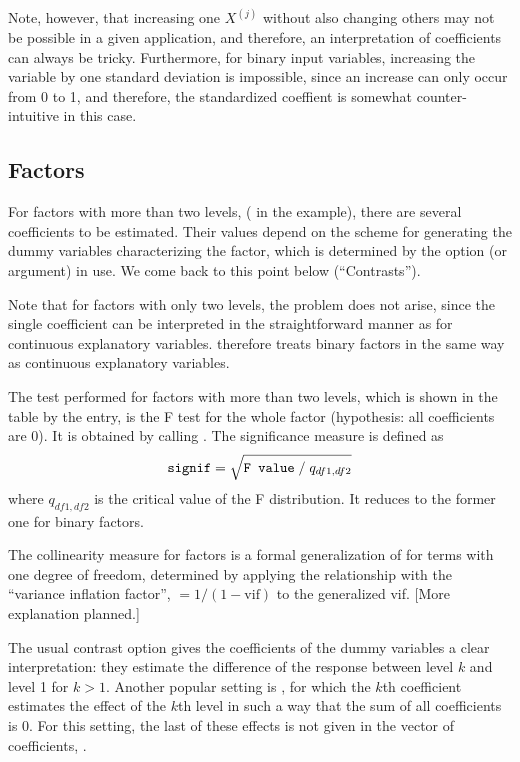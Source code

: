 \documentclass[11pt]{article}
\begin{document}
Note, however, that increasing one $X^{(j)}$ without also changing
others may not be possible in a given application, and therefore, 
an interpretation of coefficients can always be tricky.
Furthermore, for binary input variables, increasing the variable by one
standard deviation is impossible, since an increase can only occur from 0
to 1, and therefore, the standardized coeffient is somewhat 
counter-intuitive in this case.

\subsection{Factors}
For factors with more than two levels, ( in the example), there
are several coefficients to be estimated. 
Their values depend on the scheme for generating the 
dummy variables characterizing the factor, which is determined 
by the  option (or argument) in use.
We come back to this point below (``Contrasts'').

Note that for factors with only two levels, the problem does not arise,
since the single 
coefficient can be interpreted in the straightforward manner as 
for continuous explanatory variables.  therefore treats binary
factors in the same way as continuous explanatory variables.

The test performed for factors with more than two levels, which is shown 
in the  table by the  entry, 
is the F test for the whole factor (hypothesis: all coefficients are 0). 
It is obtained by calling .
The significance measure is defined as 
\[
  \texttt{signif} = \sqrt{\texttt{F value}\;/\;q_{df1,df2}}
\]
where $q_{df1,df2}$ is the critical value of the F distribution.
It reduces to the former one for binary factors.

The collinearity measure  for factors is a formal generalization of 
 for terms with one degree of freedom, determined by applying
the relationship with the ``variance inflation factor'',
$=1/(1-\mbox{vif})$ to the generalized vif. 
[More explanation planned.]

The usual contrast option  gives the coefficients of the dummy variables 
a clear interpretation: 
they estimate the difference of the response between level $k$ and 
level 1 for $k>1$.
Another popular setting is , for which the $k$th coefficient estimates the effect 
of the $k$th level in such a way that the sum of all coefficients is 0.
For this setting, the last of these effects is not given in the
vector of coefficients, .
\end{document}
